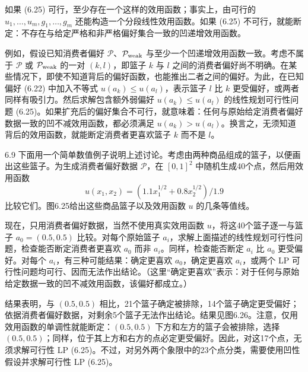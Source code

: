 如果 (6.25) 可行，至少存在一个这样的效用函数；事实上，由可行的 $u_1,\ldots,u_m,g_1,\ldots,g_m$ 还能构造一个分段线性效用函数。如果 (6.25) 不可行，就能断定：不存在与给定严格和非严格偏好集合一致的凹递增效用函数。

例如，假设已知消费者偏好 $\mathcal P$、$\mathcal P_{\rm weak}$ 与至少一个凹递增效用函数一致。考虑不属于 $\mathcal P$ 或 $\mathcal P_{\rm weak}$ 的一对 $(k,l)$，即篮子 $k$ 与 $l$ 之间的消费者偏好尚不明确。在某些情况下，即使不知道背后的偏好函数，也能推出二者之间的偏好。为此，在已知偏好 (6.22) 中加入不等式 $u(a_k)\le u(a_l)$，表示篮子 $l$ 比 $k$ 更受偏好，或两者同样有吸引力。然后求解包含额外弱偏好 $u(a_k)\le u(a_l)$ 的线性规划可行性问题 (6.25)。如果扩充后的偏好集合不可行，就意味着：任何与原始给定消费者偏好数据一致的凹不减效用函数，都必须满足 $u(a_k)>u(a_l)$。换言之，无须知道背后的效用函数，就能断定消费者更喜欢篮子 $k$ 而不是 $l$。

\begin{origexample}{6.9}
下面用一个简单数值例子说明上述讨论。考虑由两种商品组成的篮子，以便画出这些篮子。为生成消费者偏好数据 $\mathcal P$，在 $[0,1]^2$ 中随机生成40个点，然后用效用函数
\[u(x_1,x_2)=(1.1x_1^{1/2}+0.8x_2^{1/2})/1.9\]
比较它们。图6.25给出这些商品篮子以及效用函数 $u$ 的几条等值线。

现在，只用消费者偏好数据，当然不使用真实效用函数 $u$，将这40个篮子逐一与篮子 $a_0=(0.5,0.5)$ 比较。对每个原始篮子 $a_i$，求解上面描述的线性规划可行性问题，检查能否断定消费者更喜欢 $a_0$ 而非 $a_i$。同样，检查能否断定 $a_i$ 比 $a_0$ 更受偏好。对每个 $a_i$，有三种可能结果：确定更喜欢 $a_0$，确定更喜欢 $a_i$，或两个 LP 可行性问题均可行、因而无法作出结论。（这里“确定更喜欢”表示：对于任何与原始给定数据一致的凹不减效用函数，该偏好都成立。）

结果表明，与 $(0.5,0.5)$ 相比，21个篮子确定被排除，14个篮子确定更受偏好；依据消费者偏好数据，对剩余5个篮子无法作出结论。结果见图6.26。注意，仅用效用函数的单调性就能断定：$(0.5,0.5)$ 下方和左方的篮子会被排除，选择 $(0.5,0.5)$；同样，位于其上方和右方的点必定更受偏好。因此，对这17个点，无须求解可行性 LP (6.25)。不过，对另外两个象限中的23个点分类，需要使用凹性假设并求解可行性 LP (6.25)。
\end{origexample}

